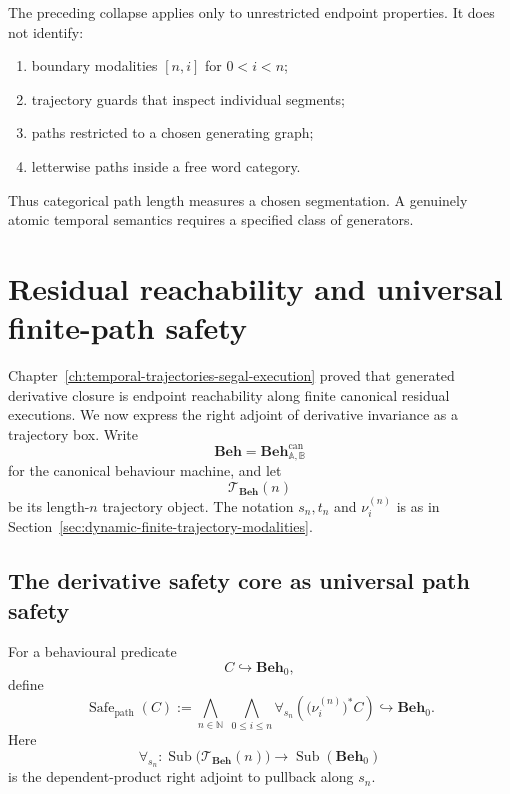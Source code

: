 \begin{remark}
\label{rem:dynamic-segmentation-sensitive-formulas}
The preceding collapse applies only to unrestricted endpoint properties.
It does not identify:

\begin{enumerate}
\item boundary modalities \([n,i]\) for \(0<i<n\);
\item trajectory guards that inspect individual segments;
\item paths restricted to a chosen generating graph;
\item letterwise paths inside a free word category.
\end{enumerate}

Thus categorical path length measures a chosen segmentation.  A genuinely
atomic temporal semantics requires a specified class of generators.
\end{remark}


\section{Residual reachability and universal finite-path safety}
\label{sec:dynamic-residual-reachability-safety}

Chapter~\ref{ch:temporal-trajectories-segal-execution} proved that generated
derivative closure is endpoint reachability along finite canonical residual
executions.  We now express the right adjoint of derivative invariance as a
trajectory box.  Write
\[
    \mathbf{Beh}
    =
    \mathbf{Beh}^{\mathrm{can}}_{\mathbb A,\mathbb B}
\]
for the canonical behaviour machine, and let
\[
    \mathscr T_{\mathbf{Beh}}(n)
\]
be its length-\(n\) trajectory object.  The notation \(s_n,t_n\) and
\(\nu_i^{(n)}\) is as in
Section~\ref{sec:dynamic-finite-trajectory-modalities}.
\subsection{The derivative safety core as universal path safety}
\label{subsec:temporal-interpretation-safety-core}

For a behavioural predicate
\[
    C\hookrightarrow\mathbf{Beh}_0,
\]
define
\[
    \operatorname{Safe}_{\mathrm{path}}(C)
    :=
    \bigwedge_{n\in\mathbb N}
    \;
    \bigwedge_{0\leq i\leq n}
    \forall_{s_n}
    \left(
        \bigl(\nu_i^{(n)}\bigr)^\ast C
    \right)
    \hookrightarrow
    \mathbf{Beh}_0.
\]
Here
\[
    \forall_{s_n}:
    \operatorname{Sub}
    \bigl(
        \mathscr T_{\mathbf{Beh}}(n)
    \bigr)
    \to
    \operatorname{Sub}(\mathbf{Beh}_0)
\]
is the dependent-product right adjoint to pullback along \(s_n\).

